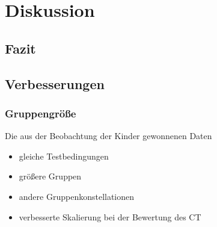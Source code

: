\chapter{Diskussion}

\section{Fazit}



\section{Verbesserungen}
\subsection{Gruppengröße}
Die aus der Beobachtung der Kinder gewonnenen Daten 




\begin{itemize}
	\item gleiche Testbedingungen
	\item größere Gruppen
	\item andere Gruppenkonstellationen
	\item verbesserte Skalierung bei der Bewertung des CT
\end{itemize}

